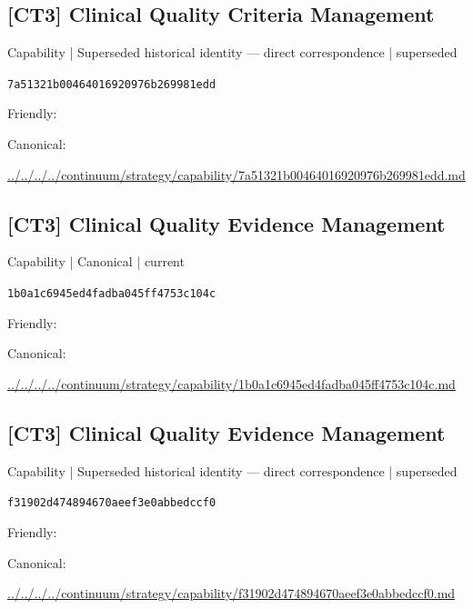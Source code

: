 \documentclass[10pt,a4paper]{article}
\begin{document}
\subsection*{[CT3] Clinical Quality Criteria Management}
{\small Capability | Superseded historical identity — direct correspondence | superseded}\par
\texttt{7a51321b00464016920976b269981edd}\par
Friendly: \par
Canonical: \par
{\footnotesize\url{../../../../continuum/strategy/capability/7a51321b00464016920976b269981edd.md}}\par
\subsection*{[CT3] Clinical Quality Evidence Management}
{\small Capability | Canonical | current}\par
\texttt{1b0a1c6945ed4fadba045ff4753c104c}\par
Friendly: \par
Canonical: \par
{\footnotesize\url{../../../../continuum/strategy/capability/1b0a1c6945ed4fadba045ff4753c104c.md}}\par
\subsection*{[CT3] Clinical Quality Evidence Management}
{\small Capability | Superseded historical identity — direct correspondence | superseded}\par
\texttt{f31902d474894670aeef3e0abbedccf0}\par
Friendly: \par
Canonical: \par
{\footnotesize\url{../../../../continuum/strategy/capability/f31902d474894670aeef3e0abbedccf0.md}}\par
\end{document}
